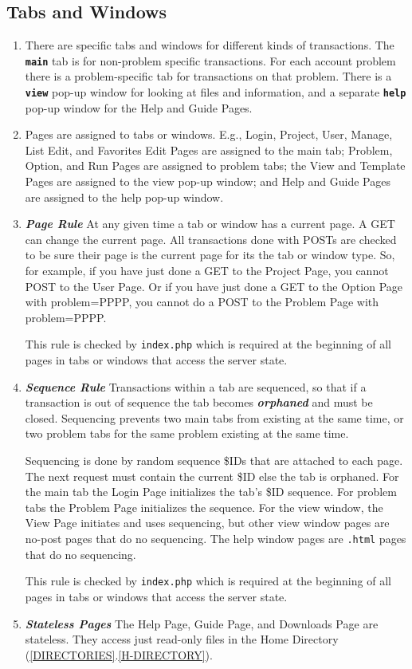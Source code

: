\documentclass[12pt]{article}
\newcommand{\TT}[1]{{\tt \bfseries #1}}
\newcommand{\key}[1]{{\bf \em #1}}
\newcommand{\sref}[2]{(\ref{#1}.\ref{#2})}
\begin{document}
\subsection{Tabs and Windows}
\label{TABS-AND-WINDOWS}

\begin{enumerate}
\item There are specific tabs and windows for different kinds
of transactions.  The \TT{main} tab is for non-problem specific
transactions.  For each account problem there is a problem-specific
tab for transactions on that problem.  There is a \TT{view}
pop-up window for looking at files and information, and a
separate \TT{help} pop-up window for the Help and Guide Pages.

\item Pages are assigned to tabs or windows.  E.g., Login, Project,
User, Manage, List Edit, and Favorites Edit Pages are assigned
to the main tab;
Problem, Option, and Run Pages are assigned to problem tabs;
the View and Template Pages are assigned to the view pop-up
window; and Help and Guide Pages are assigned to the help pop-up
window.

\item \key{Page Rule}\label{PAGE-RULE}
At any given time a tab or window has a current page.
A GET can change the current page.  All
transactions done with POSTs
are checked to be sure their page is the current page for
its the tab or window type.  So, for example,
if you have just done a GET to the Project Page,
you cannot POST to the User Page.  Or if you have
just done a GET to the Option Page with problem=PPPP,
you cannot do a POST to the Problem Page with problem=PPPP.

This rule is checked by {\tt index.php} which is required
at the beginning of all pages in tabs or windows that
access the server state.

\item \key{Sequence Rule}\label{SEQUENCE-RULE}
Transactions within a tab are sequenced, so that
if a transaction is out of sequence the tab becomes
\key{orphaned} and must be closed.
Sequencing prevents two main
tabs from existing at the same time, or two problem tabs
for the same problem existing at the same time.

Sequencing is done
by random sequence \$IDs that are attached to each page.
The next request must contain the current \$ID else the
tab is orphaned.  For the main tab the Login Page initializes
the tab's \$ID sequence.  For problem tabs the Problem Page
initializes the sequence.  For the view window, the View Page
initiates and uses sequencing, but other view window pages are
no-post pages that do no sequencing.  The help window pages are
{\tt .html} pages that do no sequencing.

This rule is checked by {\tt index.php} which is required
at the beginning of all pages in tabs or windows that
access the server state.

\item \key{Stateless Pages}\label{STATELESS-PAGES}
The Help Page, Guide Page, and Downloads Page are stateless.
They access just read-only files in the Home Directory
\sref{DIRECTORIES}{H-DIRECTORY}.
\end{enumerate}
\end{document}
